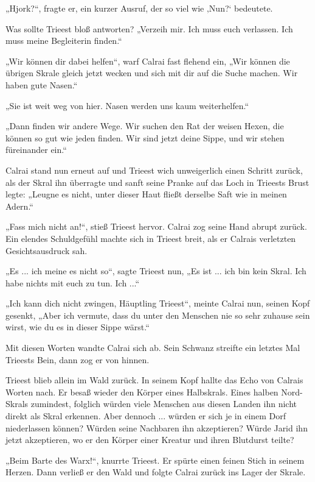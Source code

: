 „Hjork?“, fragte er, ein kurzer Ausruf, der so viel wie ‚Nun?‘ bedeutete.

Was sollte Trieest bloß antworten? „Verzeih mir. Ich muss euch verlassen. Ich muss meine Begleiterin finden.“

„Wir können dir dabei helfen“, warf Calrai fast flehend ein, „Wir können die übrigen Skrale gleich jetzt wecken und sich mit dir auf die Suche machen. Wir haben gute Nasen.“

„Sie ist weit weg von hier. Nasen werden uns kaum weiterhelfen.“

„Dann finden wir andere Wege. Wir suchen den Rat der weisen Hexen, die können so gut wie jeden finden. Wir sind jetzt deine Sippe, und wir stehen füreinander ein.“

Calrai stand nun erneut auf und Trieest wich unweigerlich einen Schritt zurück, als der Skral ihn überragte und sanft seine Pranke auf das Loch in Trieests Brust legte: „Leugne es nicht, unter dieser Haut fließt derselbe Saft wie in meinen Adern.“

„Fass mich nicht an!“, stieß Trieest hervor. Calrai zog seine Hand abrupt zurück. Ein elendes Schuldgefühl machte sich in Trieest breit, als er Calrais verletzten Gesichtsausdruck sah.

„Es ... ich meine es nicht so“, sagte Trieest nun, „Es ist ... ich bin kein Skral. Ich habe nichts mit euch zu tun. Ich ...“

„Ich kann dich nicht zwingen, Häuptling Trieest“, meinte Calrai nun, seinen Kopf gesenkt, „Aber ich vermute, dass du unter den Menschen nie so sehr zuhause sein wirst, wie du es in dieser Sippe wärst.“

Mit diesen Worten wandte Calrai sich ab. Sein Schwanz streifte ein letztes Mal Trieests Bein, dann zog er von hinnen.

Trieest blieb allein im Wald zurück. In seinem Kopf hallte das Echo von Calrais Worten nach. Er besaß wieder den Körper eines Halbskrals. Eines halben Nord-Skrals zumindest, folglich würden viele Menschen aus diesen Landen ihn nicht direkt als Skral erkennen. Aber dennoch ... würden er sich je in einem Dorf niederlassen können? Würden seine Nachbaren ihn akzeptieren? Würde Jarid ihn jetzt akzeptieren, wo er den Körper einer Kreatur und ihren Blutdurst teilte?

„Beim Barte des Warx!“, knurrte Trieest. Er spürte einen feinen Stich in seinem Herzen. Dann verließ er den Wald und folgte Calrai zurück ins Lager der Skrale.



